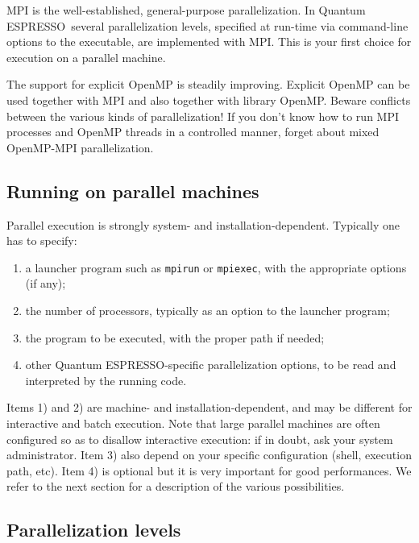 \documentclass[12pt,a4paper]{article}
\def\qe{{\sc Quantum ESPRESSO}}
\begin{document}
MPI is the well-established, general-purpose parallelization.
In \qe\ several parallelization levels, specified at run-time
via command-line options to the executable, are implemented
with MPI. This is your first choice for execution on a parallel
machine.

The support for explicit OpenMP is steadily improving.
Explicit OpenMP can be used together with MPI and also 
together with library OpenMP. Beware
conflicts between the various kinds of parallelization!
If you don't know how to run MPI processes
and OpenMP threads in a controlled manner, forget about mixed
OpenMP-MPI parallelization.

\subsection{Running on parallel machines}

Parallel execution is strongly system- and installation-dependent.
Typically one has to specify:
\begin{enumerate}
\item a launcher program such as \texttt{mpirun} or \texttt{mpiexec},
  with the  appropriate options (if any);
\item the number of processors, typically as an option to the launcher
  program;
\item the program to be executed, with the proper path if needed;
\item other \qe-specific parallelization options, to be
  read and interpreted by the running code.
\end{enumerate}
Items 1) and 2) are machine- and installation-dependent, and may be
different for interactive and batch execution. Note that large
parallel machines are  often configured so as to disallow interactive
execution: if in doubt, ask your system administrator.
Item 3) also depend on your specific configuration (shell, execution path, etc).
Item 4) is optional but it is very important
for good performances. We refer to the next
section for a description of the various
possibilities.

\subsection{Parallelization levels}
\end{document}
